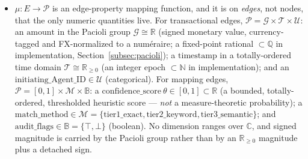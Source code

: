 \begin{itemize}
\begin{itemize}
    \end{itemize}
    These categorical domains are precisely why the deterministic boundary checks (Section~\ref{sec:deterministic}) are equality and membership tests rather than numeric comparisons.
    \item $\mu: E \rightarrow \mathcal{P}$ is an edge-property mapping function, and it is on \emph{edges}, not nodes, that the only numeric quantities live. For transactional edges, $\mathcal{P} = \mathcal{G} \times \mathcal{T} \times \mathcal{U}$: an $\text{amount}$ in the Pacioli group $\mathcal{G} \cong \mathbb{R}$ (signed monetary value, currency-tagged and FX-normalized to a num\'eraire; a fixed-point rational $\subset \mathbb{Q}$ in implementation, Section~\ref{subsec:pacioli}); a $\text{timestamp}$ in a totally-ordered time domain $\mathcal{T} \cong \mathbb{R}_{\geq 0}$ (an integer epoch $\subset \mathbb{N}$ in implementation); and an $\text{initiating\_Agent\_ID} \in \mathcal{U}$ (categorical). For mapping edges, $\mathcal{P} = [0,1] \times \mathcal{M} \times \mathbb{B}$: a $\text{confidence\_score}\ \theta \in [0,1] \subset \mathbb{R}$ (a bounded, totally-ordered, thresholded heuristic score --- \emph{not} a measure-theoretic probability); a $\text{match\_method} \in \mathcal{M} = \{\text{tier1\_exact}, \text{tier2\_keyword}, \text{tier3\_semantic}\}$; and $\text{audit\_flags} \in \mathbb{B} = \{\top, \bot\}$ (boolean). No dimension ranges over $\mathbb{C}$, and signed magnitude is carried by the Pacioli group rather than by an $\mathbb{R}_{\geq 0}$ magnitude plus a detached sign.
\end{itemize}

